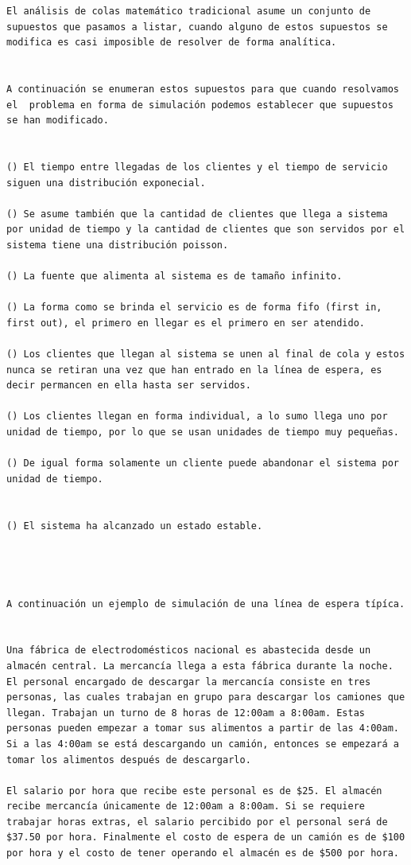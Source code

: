 \begin{verbatim}
El análisis de colas matemático tradicional asume un conjunto de supuestos que pasamos a listar, cuando alguno de estos supuestos se modifica es casi imposible de resolver de forma analítica.


A continuación se enumeran estos supuestos para que cuando resolvamos el  problema en forma de simulación podemos establecer que supuestos se han modificado.


() El tiempo entre llegadas de los clientes y el tiempo de servicio siguen una distribución exponecial.

() Se asume también que la cantidad de clientes que llega a sistema por unidad de tiempo y la cantidad de clientes que son servidos por el sistema tiene una distribución poisson.

() La fuente que alimenta al sistema es de tamaño infinito.

() La forma como se brinda el servicio es de forma fifo (first in, first out), el primero en llegar es el primero en ser atendido.

() Los clientes que llegan al sistema se unen al final de cola y estos nunca se retiran una vez que han entrado en la línea de espera, es decir permancen en ella hasta ser servidos.

() Los clientes llegan en forma individual, a lo sumo llega uno por unidad de tiempo, por lo que se usan unidades de tiempo muy pequeñas.

() De igual forma solamente un cliente puede abandonar el sistema por unidad de tiempo.


() El sistema ha alcanzado un estado estable.




A continuación un ejemplo de simulación de una línea de espera típíca.


Una fábrica de electrodomésticos nacional es abastecida desde un almacén central. La mercancía llega a esta fábrica durante la noche. El personal encargado de descargar la mercancía consiste en tres personas, las cuales trabajan en grupo para descargar los camiones que llegan. Trabajan un turno de 8 horas de 12:00am a 8:00am. Estas personas pueden empezar a tomar sus alimentos a partir de las 4:00am. Si a las 4:00am se está descargando un camión, entonces se empezará a tomar los alimentos después de descargarlo.

El salario por hora que recibe este personal es de $25. El almacén recibe mercancía únicamente de 12:00am a 8:00am. Si se requiere trabajar horas extras, el salario percibido por el personal será de $37.50 por hora. Finalmente el costo de espera de un camión es de $100 por hora y el costo de tener operando el almacén es de $500 por hora.


\end{verbatim}
